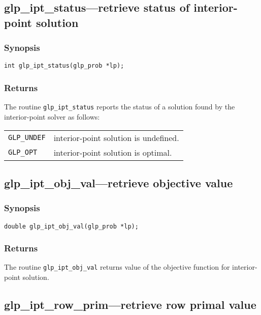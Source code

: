\subsection{glp\_ipt\_status---retrieve status of interior-point
solution}

\subsubsection*{Synopsis}

\begin{verbatim}
int glp_ipt_status(glp_prob *lp);
\end{verbatim}

\subsubsection*{Returns}

The routine \verb|glp_ipt_status| reports the status of a solution
found by the interior-point solver as follows:

\begin{tabular}{@{}p{25mm}p{91.3mm}@{}}
\verb|GLP_UNDEF| & interior-point solution is undefined. \\
\verb|GLP_OPT|   & interior-point solution is optimal. \\
\end{tabular}

\newpage

\subsection{glp\_ipt\_obj\_val---retrieve objective value}

\subsubsection*{Synopsis}

\begin{verbatim}
double glp_ipt_obj_val(glp_prob *lp);
\end{verbatim}

\subsubsection*{Returns}

The routine \verb|glp_ipt_obj_val| returns value of the objective
function for interior-point solution.

\subsection{glp\_ipt\_row\_prim---retrieve row primal value}

